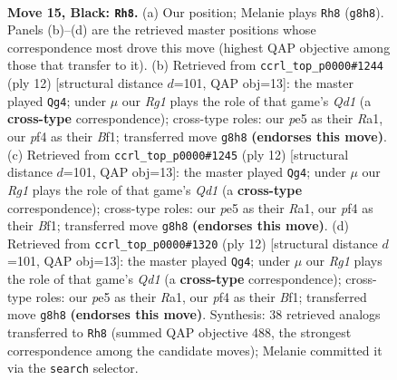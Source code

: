 \documentclass[11pt]{article}
\begin{document}
\clearpage

\begin{figure}[p]\centering
\begin{subfigure}{0.46\textwidth}\centering
\resizebox{\linewidth}{!}{%
\newchessgame
\chessboard[
  setfen={rn1qkbr1/p4ppp/b1p1p3/2PpP2P/PP3PP1/2P5/3N4/R1BQK1NR b KQq - 0 15},
  showmover=false,
  pgfstyle=straightmove, color=movearrow, markmove={g8-h8}
]}
\caption{}
\end{subfigure}\hfill
\begin{subfigure}{0.46\textwidth}\centering
\resizebox{\linewidth}{!}{%
\newchessgame
\chessboard[
  setfen={rnbqk2r/pp2nppp/4p3/2ppP3/3P4/P1P5/2P2PPP/R1BQKBNR w KQkq - 1 7},
  showmover=false,
  pgfstyle=straightmove, color=movearrow, markmove={d1-g4}
]}
\caption{}
\end{subfigure}
\\[4pt]
\begin{subfigure}{0.46\textwidth}\centering
\resizebox{\linewidth}{!}{%
\newchessgame
\chessboard[
  setfen={rnbqk2r/pp2nppp/4p3/2ppP3/3P4/P1P5/2P2PPP/R1BQKBNR w KQkq - 1 7},
  showmover=false,
  pgfstyle=straightmove, color=movearrow, markmove={d1-g4}
]}
\caption{}
\end{subfigure}\hfill
\begin{subfigure}{0.46\textwidth}\centering
\resizebox{\linewidth}{!}{%
\newchessgame
\chessboard[
  setfen={rnbqk2r/pp2nppp/4p3/2ppP3/3P4/P1P5/2P2PPP/R1BQKBNR w KQkq - 1 7},
  showmover=false,
  pgfstyle=straightmove, color=movearrow, markmove={d1-g4}
]}
\caption{}
\end{subfigure}
\caption{\textbf{Move 15, Black: \texttt{Rh8}.} (a) Our position; Melanie plays \texttt{Rh8} (\texttt{g8h8}). Panels (b)--(d) are the retrieved master positions whose correspondence most drove this move (highest QAP objective among those that transfer to it). (b) Retrieved from \texttt{ccrl\_top\_p0000\#1244} (ply 12) [structural distance $d$=101, QAP obj=13]: the master played \texttt{Qg4}; under $\mu$ our \emph{Rg1} plays the role of that game's \emph{Qd1} (a \textbf{cross-type} correspondence); cross-type roles: our \emph{p}e5 as their \emph{R}a1, our \emph{p}f4 as their \emph{B}f1; transferred move \texttt{g8h8} \textbf{(endorses this move)}. (c) Retrieved from \texttt{ccrl\_top\_p0000\#1245} (ply 12) [structural distance $d$=101, QAP obj=13]: the master played \texttt{Qg4}; under $\mu$ our \emph{Rg1} plays the role of that game's \emph{Qd1} (a \textbf{cross-type} correspondence); cross-type roles: our \emph{p}e5 as their \emph{R}a1, our \emph{p}f4 as their \emph{B}f1; transferred move \texttt{g8h8} \textbf{(endorses this move)}. (d) Retrieved from \texttt{ccrl\_top\_p0000\#1320} (ply 12) [structural distance $d$=101, QAP obj=13]: the master played \texttt{Qg4}; under $\mu$ our \emph{Rg1} plays the role of that game's \emph{Qd1} (a \textbf{cross-type} correspondence); cross-type roles: our \emph{p}e5 as their \emph{R}a1, our \emph{p}f4 as their \emph{B}f1; transferred move \texttt{g8h8} \textbf{(endorses this move)}. Synthesis: 38 retrieved analogs transferred to \texttt{Rh8} (summed QAP objective 488, the strongest correspondence among the candidate moves); Melanie committed it via the \texttt{search} selector.}
\label{fig:thought-m29}
\end{figure}
\end{document}
